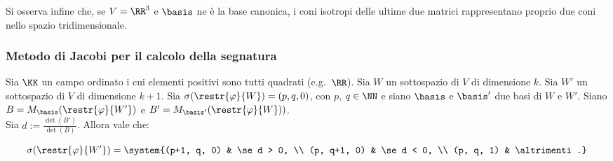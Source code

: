 Si osserva infine che, se $V = \RR^3$ e $\basis$ ne è la base canonica, i coni isotropi delle ultime due matrici rappresentano proprio due coni nello spazio tridimensionale.

\subsubsection{Metodo di Jacobi per il calcolo della segnatura}

\begin{proposition} \label{prop:pre_metodo_jacobi} Sia $\KK$ un campo ordinato
	i cui elementi positivi sono tutti quadrati (e.g.~$\RR$). 
	Sia $W$ un sottospazio di $V$ di dimensione $k$. Sia $W'$ un sottospazio di $V$ di dimensione
	$k+1$. Sia $\sigma(\restr{\varphi}{W}) = (p, q, 0)$, con $p$, $q \in \NN$ e siano $\basis$ e $\basis'$
	due basi di $W$ e $W'$. Siano $B = M_\basis(\restr{\varphi}{W'})$ e $B' = M_{\basis'}(\restr{\varphi}{W}))$. \\
	
	Sia $d := \displaystyle\frac{\det(B')}{\det(B)}$. Allora vale che:
	
	\[ \sigma(\restr{\varphi}{W'}) = \system{(p+1, q, 0) & \se d > 0, \\ (p, q+1, 0) & \se d < 0, \\ (p, q, 1) & \altrimenti.} \]
	
	\vskip 0.05in
\end{proposition}

